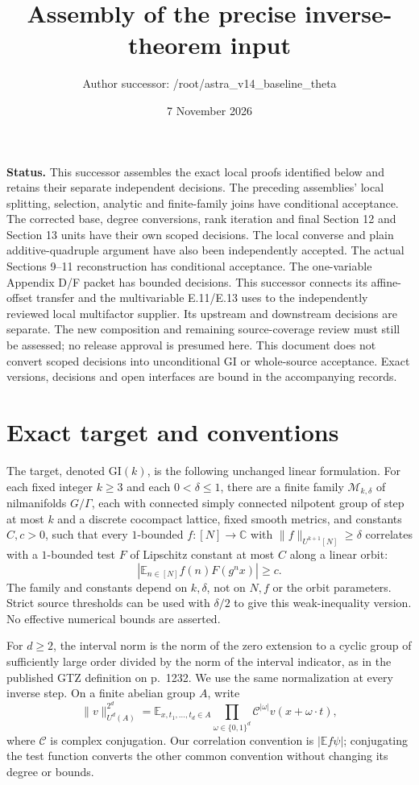\documentclass[11pt]{article}
\title{Assembly of the precise inverse-theorem input}
\author{Author successor: /root/astra\_v14\_baseline\_theta}
\date{7 November 2026}
\newcommand{\C}{\mathbb C}
\newcommand{\E}{\mathbb E}
\newcommand{\GI}{\mathrm{GI}}
\begin{document}
\maketitle

\noindent\textbf{Status.} This successor assembles the exact local proofs
identified below and retains their separate independent decisions.
The preceding assemblies' local splitting, selection, analytic and
finite-family joins have conditional acceptance. The corrected base,
degree conversions, rank iteration and final Section 12 and Section 13
units have their own scoped decisions. The local converse and plain
additive-quadruple argument have also been independently accepted.
The actual Sections 9--11 reconstruction has conditional acceptance.
The one-variable Appendix D/F packet has bounded decisions. This
successor connects its affine-offset transfer and the multivariable
E.11/E.13 uses to the independently reviewed local multifactor
supplier. Its upstream and downstream decisions are separate.
The new composition and remaining source-coverage review must
still be assessed; no release approval is presumed here.
This document does not convert scoped decisions into unconditional GI
or whole-source acceptance. Exact versions, decisions and open
interfaces are bound in the accompanying records.

\section{Exact target and conventions}

The target, denoted $\GI(k)$, is the following unchanged linear formulation.
For each fixed integer $k\geq3$ and each $0<\delta\leq1$, there are a finite
family $\mathcal M_{k,\delta}$ of nilmanifolds $G/\Gamma$, each with connected
simply connected nilpotent group of step at most $k$ and a discrete cocompact
lattice, fixed smooth metrics, and constants $C,c>0$, such that every
$1$-bounded $f:[N]\to\C$ with $\|f\|_{U^{k+1}[N]}\geq\delta$ correlates with
a $1$-bounded test $F$ of Lipschitz constant at most $C$ along a linear orbit:
\[
 \left|\E_{n\in[N]}f(n)F(g^nx)\right|\geq c.
\]
The family and constants depend on $k,\delta$, not on $N,f$ or the orbit
parameters. Strict source thresholds can be used with $\delta/2$ to give
this weak-inequality version. No effective numerical bounds are asserted.

For $d\geq2$, the interval norm is the norm of the zero extension to a
cyclic group of sufficiently large order divided by the norm of the
interval indicator, as in the published GTZ definition on p.~1232.
We use the same normalization at every inverse step. On a finite abelian
group $A$, write
\[
 \|v\|_{U^d(A)}^{2^d}
 =\E_{x,t_1,\ldots,t_d\in A}
   \prod_{\omega\in\{0,1\}^d}\mathcal C^{|\omega|}
     v(x+\omega\cdot t),
\]
where $\mathcal C$ is complex conjugation. Our correlation convention is
$|\E f\psi|$; conjugating the test function converts the other common
convention without changing its degree or bounds.
\end{document}
